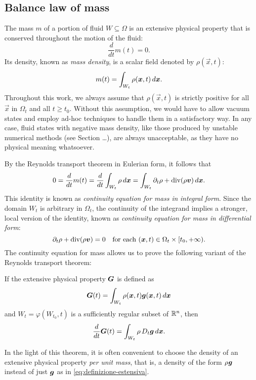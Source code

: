 \subsection*{Balance law of mass}

The mass $m$ of a portion of fluid $W \subseteq \Omega$ is an
extensive physical property that is conserved throughout the motion of the fluid:
\[
\frac{d}{dt} m(t) = 0.
\]
Its density, known as \emph{mass density}, is a scalar field
denoted by $\rho(\vec{x},t)$:
\[
m(t) = \int_{W_t} \rho(\bm{x},t) \, d\bm{x}.
\]
Throughout this work, we always assume that $\rho(\vec{x},t)$ is strictly
positive for all $\vec{x}$ in $\Omega_t$ and all $t \geq t_0$.
Without this assumption, we would have to allow vacuum states
and employ ad-hoc techniques to handle them in a satisfactory way.
In any case, fluid states with negative mass density, like those
produced by unstable numerical methods (see Section \dots), %
are always unacceptable, as they have no physical meaning whatsoever.

By the Reynolds transport theorem in Eulerian form, it follows that
\begin{equation} \label{eq:continuita-forma-integrale}
0
= \frac{d}{dt} m(t)
= \frac{d}{dt} \int_{W_t} \rho \, d\bm{x}
= \int_{W_t} \partial_t \rho + \operatorname{div}(\rho \bm{v}) \, d\bm{x}.
\end{equation}
This identity is known as \emph{continuity equation for mass in integral form}.
Since the domain $W_t$ is arbitrary in $\Omega_t$, the continuity of the
integrand implies a stronger, local version of the identity, known as
\emph{continuity equation for mass in differential form}:
\begin{equation} \label{eq:continuita-forma-differenziale}
\partial_t \rho + \operatorname{div}(\rho \bm{v}) = 0
\quad \text{for each $(\bm{x},t) \in \Omega_t \times [t_0,+\infty)$.}
\end{equation}
The continuity equation for mass allows us to prove the following variant
of the Reynolds transport theorem:
\begin{teor} \label{teor:reynolds-per-unita-di-massa}
If the extensive physical property $\bm{G}$ is defined as
\[
\bm{G}(t) = \int_{W_t} \rho(\bm{x},t) \bm{g}(\bm{x},t) \, d\bm{x}
\]
and $W_t = \varphi(W_{t_0},t)$ is a sufficiently regular
subset of $\mathbb{R}^n$, then
\[
\frac{d}{dt} \bm{G}(t) = \int_{W_t} \rho \, D_t \bm{g} \, d\bm{x}.
\]
\end{teor}

\noindent In the light of this theorem, it is often convenient
to choose the density of an extensive physical property
\emph{per unit mass}, that is, a density of the form $\rho \:\! \bm{g}$
instead of just $\bm{g}$ as in \eqref{eq:definizione-estensiva}.

